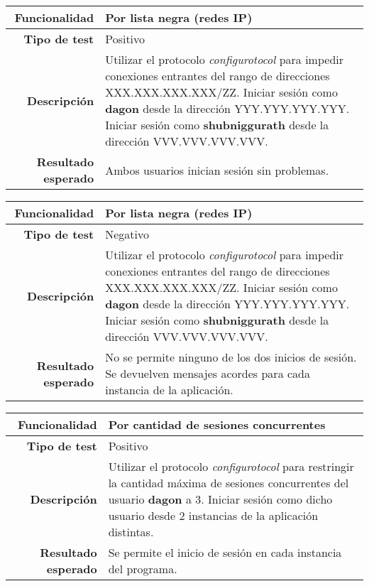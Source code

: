 \documentclass[a4paper,10pt]{article}
\begin{document}
\begin{center}
  \begin{tabular}{|r|p{12.5cm}|}
    \hline
    \textbf{Funcionalidad}	&	Por lista negra (redes IP)\\
    \hline
    \textbf{Tipo de test}	&	Positivo\\
    \hline
    \textbf{Descripción}	&	Utilizar el protocolo \textit{configurotocol} para impedir conexiones
					entrantes del rango de direcciones XXX.XXX.XXX.XXX/ZZ. Iniciar sesión como
					\textbf{dagon} desde la dirección YYY.YYY.YYY.YYY. Iniciar sesión como
					\textbf{shubniggurath} desde la dirección VVV.VVV.VVV.VVV.\\
    \hline
    \textbf{Resultado esperado}	&	Ambos usuarios inician sesión sin problemas.\\
    \hline   
  \end{tabular}
\end{center}

\begin{center}
  \begin{tabular}{|r|p{12.5cm}|}
    \hline
    \textbf{Funcionalidad}	&	Por lista negra (redes IP)\\
    \hline
    \textbf{Tipo de test}	&	Negativo\\
    \hline
    \textbf{Descripción}	&	Utilizar el protocolo \textit{configurotocol} para impedir conexiones
					entrantes del rango de direcciones XXX.XXX.XXX.XXX/ZZ. Iniciar sesión como
					\textbf{dagon} desde la dirección YYY.YYY.YYY.YYY. Iniciar sesión como
					\textbf{shubniggurath} desde la dirección VVV.VVV.VVV.VVV.\\
    \hline
    \textbf{Resultado esperado}	&	No se permite ninguno de los dos inicios de sesión. Se devuelven mensajes
					acordes para cada instancia de la aplicación.\\
    \hline   
  \end{tabular}
\end{center}

\begin{center}
  \begin{tabular}{|r|p{12.5cm}|}
    \hline
    \textbf{Funcionalidad}	&	Por cantidad de sesiones concurrentes\\
    \hline
    \textbf{Tipo de test}	&	Positivo\\
    \hline
    \textbf{Descripción}	&	Utilizar el protocolo \textit{configurotocol} para restringir la cantidad
					máxima de sesiones concurrentes del usuario \textbf{dagon} a 3.
					Iniciar sesión como dicho usuario desde 2 instancias de la aplicación
					distintas.\\
    \hline
    \textbf{Resultado esperado}	&	Se permite el inicio de sesión en cada instancia del programa.\\
    \hline   
  \end{tabular}
\end{center}
\end{document}
